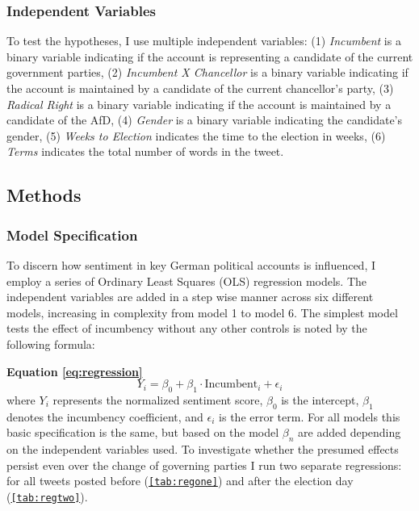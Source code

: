\documentclass[a4paper,11pt]{article}
\begin{document}
\hypertarget{independent-variables}{%
\subsubsection{Independent Variables}\label{independent-variables}}

To test the hypotheses, I use multiple independent variables: (1) \emph{Incumbent} is a binary variable indicating if the account is representing a candidate of the current government parties, (2) \emph{Incumbent X Chancellor} is a binary variable indicating if the account is maintained by a candidate of the current chancellor's party, (3) \emph{Radical Right} is a binary variable indicating if the account is maintained by a candidate of the AfD, (4) \emph{Gender} is a binary variable indicating the candidate's gender, (5) \emph{Weeks to Election} indicates the time to the election in weeks, (6) \emph{Terms} indicates the total number of words in the tweet.

\hypertarget{methods}{%
\subsection{Methods}\label{methods}}

\hypertarget{model-specification}{%
\subsubsection{Model Specification}\label{model-specification}}

To discern how sentiment in key German political accounts is influenced, I employ a series of Ordinary Least Squares (OLS) regression models. The independent variables are added in a step wise manner across six different models, increasing in complexity from model 1 to model 6. The simplest model tests the effect of incumbency without any other controls is noted by the following formula:

\textbf{Equation \eqref{eq:regression}}
\begin{equation}
Y_{i} = \beta_{0} + \beta_{1} \cdot \text{Incumbent}_{i} + \epsilon_{i}
\tag{3} 
\label{eq:regression}
\end{equation}
where \(Y_{i}\) represents the normalized sentiment score, \(\beta_{0}\) is the intercept, \(\beta_{1}\) denotes the incumbency coefficient, and \(\epsilon_{i}\) is the error term. For all models this basic specification is the same, but based on the model \(\beta_{n}\) are added depending on the independent variables used. To investigate whether the presumed effects persist even over the change of governing parties I run two separate regressions: for all tweets posted before (\texttt{\ref{tab:regone}}) and after the election day (\texttt{\ref{tab:regtwo}}).
\end{document}
